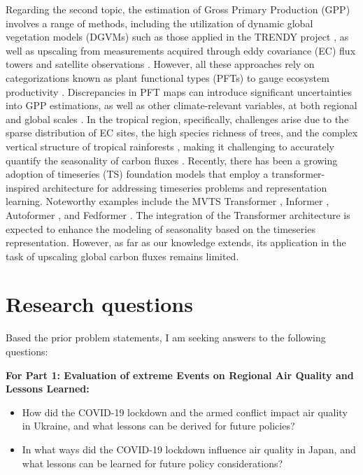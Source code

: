 Regarding the second topic, the estimation of Gross Primary Production (GPP) involves a range of methods, including the utilization of dynamic global vegetation models (DGVMs) such as those applied in the TRENDY project \citep{sitch2015recent, le2018global}, as well as upscaling from measurements acquired through eddy covariance (EC) flux towers and satellite observations \citep{jung2019fluxcom, zeng2020global}. However, all these approaches rely on categorizations known as plant functional types (PFTs) to gauge ecosystem productivity \citep{poulter2011plant, poulter2015plant, lin2021improved, guo2023estimating, yan2023integrating}. Discrepancies in PFT maps can introduce significant uncertainties into GPP estimations, as well as other climate-relevant variables, at both regional and global scales \citep{poulter2011plant}. In the tropical region, specifically, challenges arise due to the sparse distribution of EC sites, the high species richness of trees, and the complex vertical structure of tropical rainforests \citep{montgomery2001forest}, making it challenging to accurately quantify the seasonality of carbon fluxes \citep{xu2015satellite}. Recently, there has been a growing adoption of timeseries (TS) foundation models that employ a transformer-inspired architecture for addressing timeseries problems and representation learning. Noteworthy examples include the MVTS Transformer \citep{zerveas2021transformer}, Informer \citep{zhou2021informer}, Autoformer \citep{wu2021autoformer}, and Fedformer \citep{zhou2022fedformer}. The integration of the Transformer architecture is expected to enhance the modeling of seasonality based on the timeseries representation. However, as far as our knowledge extends, its application in the task of upscaling global carbon fluxes remains limited. \par
\section{Research questions}
Based the prior problem statements, I am seeking answers to the following questions:

\textbf{For Part 1: Evaluation of extreme Events on Regional Air Quality and Lessons Learned:}
\begin{itemize}
    \item How did the COVID-19 lockdown and the armed conflict impact air quality in Ukraine, and what lessons can be derived for future policies?
    \item In what ways did the COVID-19 lockdown influence air quality in Japan, and what lessons can be learned for future policy considerations?
\end{itemize}

